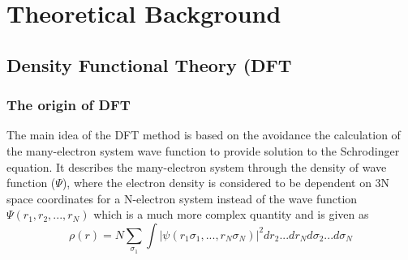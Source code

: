 \documentclass[a4paper,11pt]{report}
\begin{document}








\chapter{Theoretical Background}
\section{Density Functional Theory (DFT}
\subsection{The origin of DFT}
The main idea of the DFT \citep{jensen2017introduction} method is based on the avoidance the calculation of the many-electron system wave function
to provide solution to the Schrodinger equation. It describes the many-electron system through the density of wave function ($\Psi$), where the
electron density is considered to be dependent on 3N space coordinates for a N-electron system instead of the wave function
$\Psi(r_{1},r_{2},...,r_{N})$ which is a much more complex quantity and is given as
\begin{equation}\label{3nspace}
\rho(r) = N\sum_{\sigma_{1}}\int\bigg|\psi(r_{1}\sigma_{1},...,r_{N}\sigma_{N})\bigg|^{2}dr_{2}...dr_{N}d\sigma_{2}...d\sigma_{N}
\end{equation}
\end{document}
